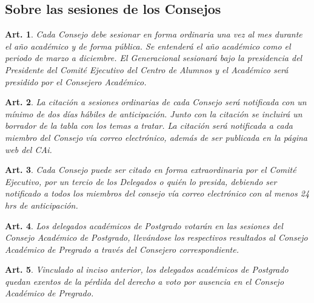 \documentclass[letterpaper,11pt]{article}
\theoremstyle{plain}
\newtheorem{art}{Art.} %
\begin{document}
		\subsection*{Sobre las sesiones de los Consejos}

			\begin{art}\label{consejos}
				Cada Consejo debe sesionar en forma ordinaria una vez al mes durante el año académico y de forma pública. Se entenderá el año académico como el periodo de marzo a diciembre. El Generacional sesionará bajo la presidencia del Presidente del Comité Ejecutivo del Centro de Alumnos y el Académico será presidido por el Consejero Académico.
			\end{art}

			\begin{art}\label{consejoOrdinario}
				La citación a sesiones ordinarias de cada Consejo será notificada con un mínimo de dos días hábiles de anticipación. Junto con la citación se incluirá un borrador de la tabla con los temas a tratar. La citación será notificada a cada miembro del Consejo vía correo electrónico, además de ser publicada en la página web del CAi.
			\end{art}

			\begin{art}\label{consejoExtraordinario}
				Cada Consejo puede ser citado en forma extraordinaria por el Comité Ejecutivo, por un tercio de los Delegados o quién lo presida, debiendo ser notificado a todos los miembros del consejo vía correo electrónico con al menos 24 hrs de anticipación.
			\end{art}

			\begin{art}\label{sesionesPostgrado}
				Los delegados académicos de Postgrado votarán en las sesiones del Consejo Académico de Postgrado, llevándose los respectivos resultados al Consejo Académico de Pregrado a través del Consejero correspondiente.
			\end{art}

			\begin{art}\label{votosPostgrado}
				Vinculado al inciso anterior, los delegados académicos de Postgrado quedan exentos de la pérdida del derecho a voto por ausencia en el Consejo Académico de Pregrado.
			\end{art}
\end{document}
